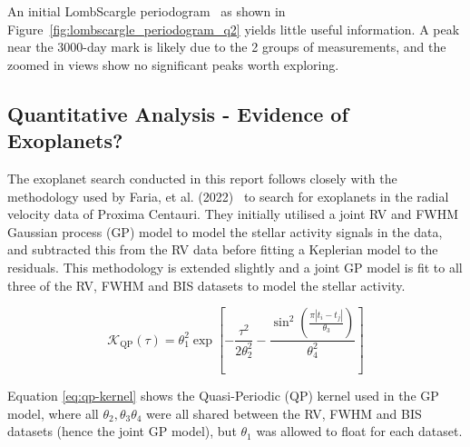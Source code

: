 An initial LombScargle periodogram~\cite{lomb, scargle} as shown in Figure~\eqref{fig:lombscargle_periodogram_q2} yields
little useful information.
A peak near the 3000-day mark is likely due to the 2 groups of measurements, and the zoomed in views show no significant
peaks worth exploring.

\subsection{Quantitative Analysis - Evidence of Exoplanets?}\label{subsec:q2-quantitative-analysis}
The exoplanet search conducted in this report follows closely with the methodology used by Faria, et al. (2022)~\cite{faria2022}
to search for exoplanets in the radial velocity data of Proxima Centauri.
They initially utilised a joint RV and FWHM Gaussian process (GP) model to model the stellar activity signals in the data,
and subtracted this from the RV data before fitting a Keplerian model to the residuals.
This methodology is extended slightly and a joint GP model is fit to all three of the RV, FWHM and BIS datasets to model
the stellar activity.

\begin{equation}\label{eq:qp-kernel}
    \mathcal{K}_{\text{QP}}(\tau) =
    \theta_1^2 \exp
    \left[
        -\frac{\tau^2}{2 \theta_2^2} - \frac{\sin^2 \left( \frac{\pi |t_{i} - t_{j}|}{\theta_3} \right)}{\theta_4^2}
    \right]
\end{equation}

Equation \eqref{eq:qp-kernel} shows the Quasi-Periodic (QP) kernel used in the GP model, where all $\theta_{2}, \theta_{3}
\theta_{4}$ were all shared between the RV, FWHM and BIS datasets (hence the joint GP model), but $\theta_{1}$ was allowed
to float for each dataset.

